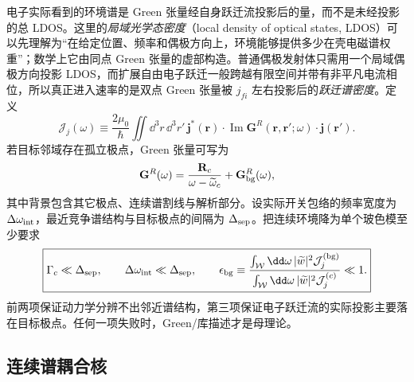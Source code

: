 电子实际看到的环境谱是 Green 张量经自身跃迁流投影后的量，而不是未经投影的总 LDOS。这里的\emph{局域光学态密度}（local density of optical states, LDOS）可以先理解为“在给定位置、频率和偶极方向上，环境能够提供多少在壳电磁谱权重”；数学上它由同点 Green 张量的虚部构造。普通偶极发射体只需用一个局域偶极方向投影 LDOS，而扩展自由电子跃迁一般跨越有限空间并带有非平凡电流相位，所以真正进入速率的是双点 Green 张量被 $j_{fi}$ 左右投影后的\emph{跃迁谱密度}。定义
\begin{equation}
\mathcal J_j(\omega)
\equiv\frac{2\mu_0}{\hbar}
\iint\dd^3 r\,\dd^3 r'\,
\mathbf j^*(\mathbf r)\cdot
\operatorname{Im}\mathbf G^R(\mathbf r,\mathbf r';\omega)
\cdot\mathbf j(\mathbf r').
\label{eq:projected_environment_spectral_density}
\end{equation}
若目标邻域存在孤立极点，Green 张量可写为
\begin{equation}
\mathbf G^R(\omega)
=\frac{\mathbf R_c}{\omega-\widetilde\omega_c}
+\mathbf G_{\rm bg}^R(\omega),
\label{eq:green_isolated_pole_laurent}
\end{equation}
其中背景包含其它极点、连续谱割线与解析部分。设实际开关包络的频率宽度为 $\Delta\omega_{\rm int}$，最近竞争谱结构与目标极点的间隔为 $\Delta_{\rm sep}$。把连续环境降为单个玻色模至少要求
\begin{equation}
\boxed{
\Gamma_c\ll\Delta_{\rm sep},
\qquad
\Delta\omega_{\rm int}\ll\Delta_{\rm sep},
\qquad
\epsilon_{\rm bg}
\equiv
\frac{\int_{\mathcal W}\dd\omega\,|\widetilde w|^2\mathcal J_j^{(\rm bg)}}
{\int_{\mathcal W}\dd\omega\,|\widetilde w|^2\mathcal J_j^{(c)}}\ll1.}
\label{eq:single_mode_pole_projection_conditions}
\end{equation}
前两项保证动力学分辨不出邻近谱结构，第三项保证电子跃迁流的实际投影主要落在目标极点。任何一项失败时，Green/库描述才是母理论。




\subsection{连续谱耦合核}

